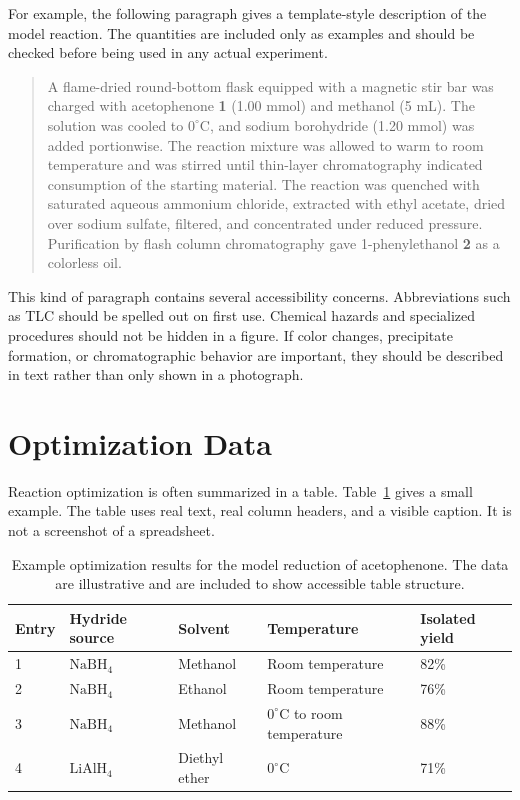 For example, the following paragraph gives a template-style description of the model reaction. The quantities are included only as examples and should be checked before being used in any actual experiment.

\begin{quote}
A flame-dried round-bottom flask equipped with a magnetic stir bar was charged with acetophenone \textbf{1} (1.00 mmol) and methanol (5 mL). The solution was cooled to \(0^{\circ}\mathrm{C}\), and sodium borohydride (1.20 mmol) was added portionwise. The reaction mixture was allowed to warm to room temperature and was stirred until thin-layer chromatography indicated consumption of the starting material. The reaction was quenched with saturated aqueous ammonium chloride, extracted with ethyl acetate, dried over sodium sulfate, filtered, and concentrated under reduced pressure. Purification by flash column chromatography gave 1-phenylethanol \textbf{2} as a colorless oil.
\end{quote}

This kind of paragraph contains several accessibility concerns. Abbreviations such as TLC should be spelled out on first use. Chemical hazards and specialized procedures should not be hidden in a figure. If color changes, precipitate formation, or chromatographic behavior are important, they should be described in text rather than only shown in a photograph.

\section{Optimization Data}
\label{sec:optimization-data}

Reaction optimization is often summarized in a table. Table~\ref{tab:organic-optimization} gives a small example. The table uses real text, real column headers, and a visible caption. It is not a screenshot of a spreadsheet.

\begin{table}[htbp]
\centering
\caption{Example optimization results for the model reduction of acetophenone. The data are illustrative and are included to show accessible table structure.}
\label{tab:organic-optimization}
\begin{tabular}{p{}p{}p{}p{}p{}}
\toprule
\textbf{Entry} & \textbf{Hydride source} & \textbf{Solvent} & \textbf{Temperature} & \textbf{Isolated yield} \\
\midrule
1 & \(\mathrm{NaBH_4}\) & Methanol & Room temperature & 82\% \\
2 & \(\mathrm{NaBH_4}\) & Ethanol & Room temperature & 76\% \\
3 & \(\mathrm{NaBH_4}\) & Methanol & \(0^{\circ}\mathrm{C}\) to room temperature & 88\% \\
4 & \(\mathrm{LiAlH_4}\) & Diethyl ether & \(0^{\circ}\mathrm{C}\) & 71\% \\
\bottomrule
\end{tabular}
\end{table}

